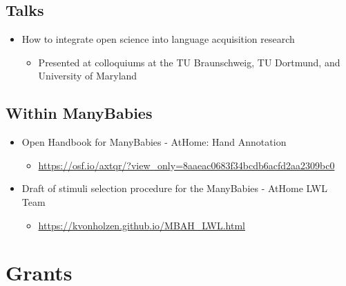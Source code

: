 \documentclass[10pt,a4paper,]{article}
\providecommand{\tightlist}{%
  \setlength{\itemsep}{0pt}\setlength{\parskip}{0pt}}
\begin{document}
\hypertarget{talks}{%
\subsection{Talks}\label{talks}}

\begin{itemize}
\tightlist
\item
  How to integrate open science into language acquisition research

  \begin{itemize}
  \tightlist
  \item
    Presented at colloquiums at the TU Braunschweig, TU Dortmund, and
    University of Maryland
  \end{itemize}
\end{itemize}

\hypertarget{within-manybabies}{%
\subsection{Within ManyBabies}\label{within-manybabies}}

\begin{itemize}
\tightlist
\item
  Open Handbook for ManyBabies - AtHome: Hand Annotation

  \begin{itemize}
  \tightlist
  \item
    \url{https://osf.io/axtqr/?view_only=8aaeac0683f34bcdb6acfd2aa2309bc0}
  \end{itemize}
\item
  Draft of stimuli selection procedure for the ManyBabies - AtHome LWL
  Team

  \begin{itemize}
  \tightlist
  \item
    \url{https://kvonholzen.github.io/MBAH_LWL.html}
  \end{itemize}
\end{itemize}

\hypertarget{grants}{%
\section{Grants}\label{grants}}
\end{document}
